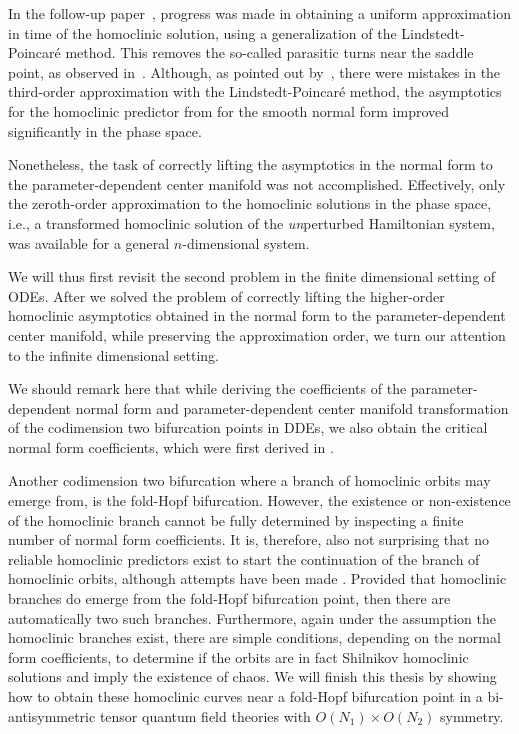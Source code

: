 In the follow-up paper~\cite{Al-Hdaibat2016}, progress was made in obtaining a
uniform approximation in time of the homoclinic solution, using a generalization
of the Lindstedt-Poincar\'e method. This removes the so-called parasitic turns
near the saddle point, as observed in~\cite{Kuznetsov2014improved}. Although, as
pointed out by~\cite{Algaba_2019}, there were mistakes in the third-order
approximation with the Lindstedt-Poincar\'e method, the asymptotics for the
homoclinic predictor from \cite{Kuznetsov2014improved} for the smooth normal form
improved significantly in the phase space.

Nonetheless, the task of correctly lifting the asymptotics in the normal form to
the parameter-dependent center manifold was not accomplished. Effectively, only
the zeroth-order approximation to the homoclinic solutions in the phase space,
i.e., a transformed homoclinic solution of the \emph{un}perturbed Hamiltonian
system, was available for a general $n$-dimensional system.

We will thus first revisit the second problem in the finite dimensional setting
of ODEs. After we solved the problem of correctly lifting the higher-order
homoclinic asymptotics obtained in the normal form to the parameter-dependent
center manifold, while preserving the approximation order, we turn our attention
to the infinite dimensional setting. 

We should remark here that while deriving the coefficients of the
parameter-dependent normal form and parameter-dependent center manifold
transformation of the codimension two bifurcation points in DDEs, we also obtain the
critical normal form coefficients, which were first derived in
\cite{Janssens:Thesis}.

Another codimension two bifurcation where a branch of homoclinic orbits may
emerge from, is the fold-Hopf bifurcation. However, the existence or non-existence
of the homoclinic branch cannot be fully determined by inspecting a finite number
of normal form coefficients. It is, therefore, also not surprising that no reliable
homoclinic predictors exist to start the continuation of the branch of homoclinic
orbits, although attempts have been made \cite{Budac:Thesis}. Provided that
homoclinic branches do emerge from the fold-Hopf bifurcation point, then there
are automatically two such branches. Furthermore, again under the
assumption the homoclinic branches exist, there are simple conditions, depending
on the normal form coefficients, to determine if the orbits are in fact Shilnikov
homoclinic solutions \cite{baldoma2020hopf} and imply the existence of chaos. We
will finish this thesis by showing how to obtain these homoclinic curves near a
fold-Hopf bifurcation point in a bi-antisymmetric tensor quantum field theories
with $O(N_1)\times O(N_2)$ symmetry.

